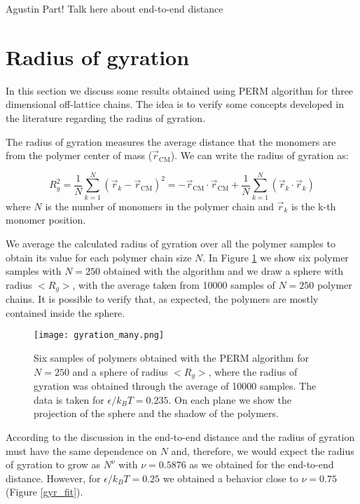 \documentclass[aps,prl,reprint,groupedaddress]{revtex4-1}
\begin{document}
Agustin Part! Talk here about end-to-end distance

\section{Radius of gyration}

In this section we discuss some results obtained using PERM algorithm for three dimensional off-lattice chains. The idea is to verify some concepts developed in the literature regarding the radius of gyration.

The radius of gyration measures the average distance that the monomers are from the polymer center of mass ($\vec{r}_{\text{CM}}$). We can write the radius of gyration as:

\begin{equation}
	R_g^2 = \frac{1}{N}\sum_{k=1}^N \left(\vec{r}_k - \vec{r}_{\text{CM}}\right)^2 = - \vec{r}_{\text{CM}} \cdot \vec{r}_{\text{CM}} + \frac{1}{N}\sum_{k=1}^N \left(\vec{r}_k \cdot \vec{r}_k \right)
\end{equation}
where $N$ is the number of monomers in the polymer chain and $\vec{r}_k$ is the k-th monomer position.

We average the calculated radius of gyration over all the polymer samples to obtain its value for each polymer chain size $N$. In Figure \ref{gyration_idea} we show six polymer samples with $N=250$ obtained with the algorithm and we draw a sphere with radius $<R_g>$, with the average taken from 10000 samples of $N=250$ polymer chains. It is possible to verify that, as expected, the polymers are mostly contained inside the sphere.  

\begin{figure}[ht]
	\texttt{[image: gyration\_many.png]}
	\caption{Six samples of polymers obtained with the PERM algorithm for $N=250$ and a sphere of radius $<R_g>$, where the radius of gyration was obtained through the average of 10000 samples. The data is taken for $\epsilon/k_B T = 0.235$. On each plane we show the projection of the sphere and the shadow of the polymers. \label{gyration_idea}}
\end{figure}

According to the discussion in \cite{Smith1975} the end-to-end distance and the radius of gyration must have the same dependence on $N$ and, therefore, we would expect the radius of gyration to grow as $N^{\nu}$ with $\nu = 0.5876$ as we obtained for the end-to-end distance. However, for $\epsilon/k_B T = 0.25$ we obtained a behavior close to $\nu = 0.75$ (Figure \ref{gyr_fit}).
\end{document}
